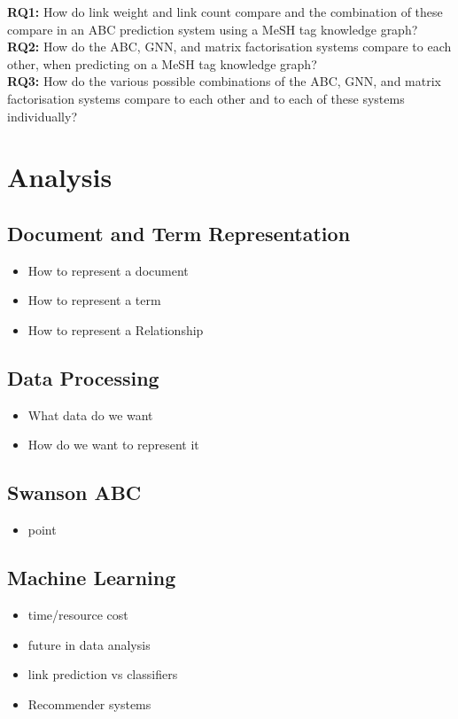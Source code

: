 \documentclass{l4proj}
\begin{document}
\textbf{RQ1:} How do link weight and link count compare and the combination of these compare in an ABC prediction system using a MeSH tag knowledge graph? \\

\textbf{RQ2:} How do the ABC, GNN, and matrix factorisation systems compare to each other, when predicting on a MeSH tag knowledge graph? \\

\textbf{RQ3:} How do the various possible combinations of the ABC, GNN, and matrix factorisation systems compare to each other and to each of these systems individually? \\
\chapter{Analysis}
\section{Document and Term Representation}
\begin{itemize}
    \item How to represent a document
    \item How to represent a term
    \item How to represent a Relationship
\end{itemize}
\section{Data Processing}
\begin{itemize}
    \item What data do we want
    \item How do we want to represent it
\end{itemize}
\section{Swanson ABC}
\begin{itemize}
    \item point
\end{itemize}
\section{Machine Learning}
\begin{itemize}
    \item time/resource cost
    \item future in data analysis
    \item link prediction vs classifiers
    \item Recommender systems
\end{itemize}
\end{document}
